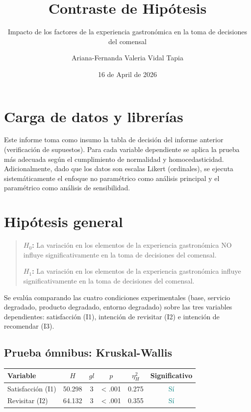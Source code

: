 \documentclass[
  spanish,
]{article}
\title{Contraste de Hipótesis}
\subtitle{Impacto de los factores de la experiencia gastronómica en la
toma de decisiones del comensal}
\author{Ariana-Fernanda Valeria Vidal Tapia}
\date{16 de April de 2026}
\begin{document}
\maketitle

{
\setcounter{tocdepth}{3}
\tableofcontents
}
\section{Carga de datos y
librerías}\label{carga-de-datos-y-libreruxedas}

Este informe toma como insumo la tabla de decisión del informe anterior
(verificación de supuestos). Para cada variable dependiente se aplica la
prueba más adecuada según el cumplimiento de normalidad y
homocedasticidad. Adicionalmente, dado que los datos son escalas Likert
(ordinales), se ejecuta sistemáticamente el enfoque no paramétrico como
análisis principal y el paramétrico como análisis de sensibilidad.

\newpage

\section{Hipótesis general}\label{hipuxf3tesis-general}

\begin{quote}
\textbf{\(H_0\):} La variación en los elementos de la experiencia
gastronómica NO influye significativamente en la toma de decisiones del
comensal.

\textbf{\(H_1\):} La variación en los elementos de la experiencia
gastronómica influye significativamente en la toma de decisiones del
comensal.
\end{quote}

Se evalúa comparando las cuatro condiciones experimentales (base,
servicio degradado, producto degradado, entorno degradado) sobre las
tres variables dependientes: satisfacción (I1), intención de revisitar
(I2) e intención de recomendar (I3).

\subsection{Prueba ómnibus:
Kruskal-Wallis}\label{prueba-uxf3mnibus-kruskal-wallis}

\begin{table}[!h]
\centering
\begin{tabular}{lcccc>{}c}
\toprule
Variable & $H$ & $gl$ & $p$ & $\eta^2_H$ & Significativo\\
\midrule
Satisfacción (I1) & 50.298 & 3 & < .001 & 0.275 & \textcolor{teal}{Sí}\\
Revisitar (I2) & 64.132 & 3 & < .001 & 0.355 & \textcolor{teal}{Sí}\\
\bottomrule
\end{tabular}
\end{table}
\end{document}
